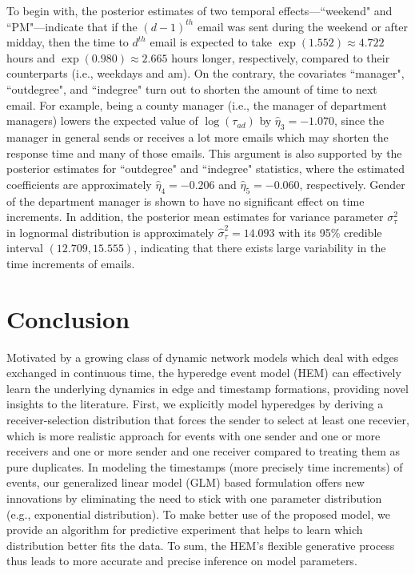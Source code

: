 \documentclass[ba]{imsart}
\numberwithin{equation}{section}
\theoremstyle{plain}
\begin{document}
	To begin with, the posterior estimates of two temporal effects---``weekend" and ``PM"---indicate that if the ${(d-1)}^{th}$ email was sent during the weekend or after midday, then the time to $d^{th}$ email is expected to take $\exp(1.552)\approx 4.722$ hours and $\exp(0.980)\approx2.665$ hours longer, respectively, compared to their counterparts (i.e., weekdays and am). On the contrary, the covariates ``manager", ``outdegree", and ``indegree" turn out to shorten the amount of time to next email. For example, being a county manager (i.e., the manager of department managers) lowers the expected value of $\log(\tau_{ad})$ by $\hat{\eta}_3 = -1.070$, since the manager in general sends or receives a lot more emails which may shorten the response time and many of those emails. This argument is also supported by the posterior estimates for ``outdegree" and ``indegree" statistics, where the estimated coefficients are approximately $\hat{\eta}_4=-0.206$ and $\hat{\eta}_5=-0.060$, respectively. Gender of the department manager is shown to have no significant effect on time increments. In addition, the posterior mean estimates for variance parameter $\sigma^2_\tau$ in lognormal distribution is approximately $\hat{\sigma}^2_\tau=14.093$ with its 95\% credible interval $(12.709, 15.555)$, indicating that there exists large variability in the time increments of emails.
\section{Conclusion}\label{sec:conclusion}
Motivated by a growing class of dynamic network models which deal with edges exchanged in continuous time, the hyperedge event model (HEM) can effectively learn the underlying dynamics in edge and timestamp formations, providing novel insights to the literature. First, we explicitly model hyperedges by deriving a receiver-selection distribution that forces the sender to select at least one recevier, which is more realistic approach for events with one sender and one or more receivers and one or more sender and one receiver compared to treating them as pure duplicates. In modeling the timestamps (more precisely time increments) of events, our generalized linear model (GLM) based formulation offers new innovations by eliminating the need to stick with one parameter distribution (e.g., exponential distribution). To make better use of the proposed model, we provide an algorithm for predictive experiment that helps to learn which distribution better fits the data. To sum, the HEM's flexible generative process thus leads to more accurate and precise inference on model parameters.
 
\end{document}
